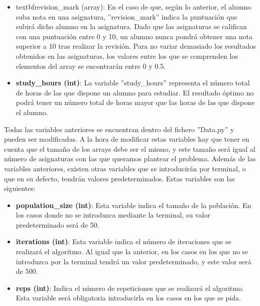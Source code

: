 \documentclass[11pt, a4paper, titlepage]{article}
\begin{document}
\begin{itemize}
\item textbf{revision\_mark (array)}: En el caso de que, según lo anterior, el alumno suba nota en una asignatura, ''revision\_mark'' indica la puntuación que subirá dicho alumno en la asignatura. Dado que las asignaturas se califican con una puntuación entre 0 y 10, un alumno nunca pondrá obtener una nota superior a 10 tras realizar la revisión. Para no variar demasiado los resultados obtenidos en las asignaturas, los valores entre los que se comprenden los elementos del array se encontrarán entre 0 y 0.5.

\vspace{5mm}

\item \textbf{study\_hours (int)}: La variable ''study\_hours'' representa el número total de horas de las que dispone un alumno para estudiar. El resultado óptimo no podrá tener un número total de horas mayor que las horas de las que dispone el alumno.

\end{itemize}

\vspace{5mm}

Todas las variables anteriores se encuentran dentro del fichero ''Data.py'' y pueden ser modificadas. A la hora de modificar estas variables hay que tener en cuenta que el tamaño de los arrays debe ser el mismo, y este tamaño será igual al número de asignaturas con las que queramos plantear el problema. Además de las variables anteriores, existen otras variables que se introducirán por terminal, o que en su defecto, tendrán valores predeterminados. Estas variables son las siguientes: 

\vspace{5mm}

\begin{itemize}
\renewcommand{\labelitemi}{$\circ$}

\item \textbf{population\_size (int)}: Esta variable indica el tamaño de la población. En los casos donde no se introduzca mediante la terminal, su valor predeterminado será de 50.

\vspace{5mm}

\item \textbf{iterations (int)}: Esta variable indica el número de iteraciones que se realizará el algoritmo. Al igual que la anterior, en los casos en los que no se introduzca por la terminal tendrá un valor predeterminado, y este valor será de 500.

\vspace{5mm}

\item \textbf{reps (int)}: Indica el número de repeticiones que se realizará el algoritmo. Esta variable será obligatoria introducirla en los casos en los que se pida.

\end{itemize}
\end{document}
